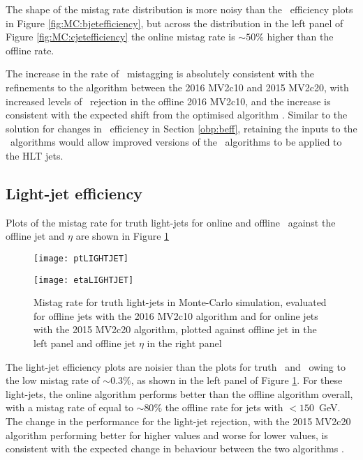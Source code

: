 		The shape of the mistag rate distribution is more noisy than the \bjet\ efficiency plots in Figure \ref{fig:MC:bjetefficiency}, but across the \pt distribution in the left panel of Figure \ref{fig:MC:cjetefficiency} the online mistag rate is $\sim50\%$ higher than the offline rate.

		The increase in the rate of \cjet\ mistagging is absolutely consistent with the refinements to the algorithm between the 2016 MV2c10 and 2015 MV2c20, with increased levels of \cjet\ rejection in the offline 2016 MV2c10, and the increase is consistent with the expected shift from the optimised algorithm \cite{btagOptimisation}. Similar to the solution for changes in \btag\ efficiency in Section \ref{obp:beff}, retaining the inputs to the \btag\ algorithms would allow improved versions of the \btag\ algorithms to be applied to the HLT jets.

	\subsection{Light-jet efficiency}

		Plots of the mistag rate for truth light-jets for online and offline \btag\ against the offline jet \pt and $\eta$ are shown in Figure \ref{fig:MC:lightjetefficiency}

		\begin{figure}[h]
			\centering
			\begin{minipage}[h]{0.48\linewidth}
				\texttt{[image: ptLIGHTJET]}

			\end{minipage}
			\quad
			\begin{minipage}[h]{0.48\linewidth}
				\texttt{[image: etaLIGHTJET]}
			\end{minipage}
			\caption[Comparison of mistag rate between online and offline truth light-jets in Monte-Carlo simulation]{Mistag rate for truth light-jets in Monte-Carlo simulation, evaluated for offline jets with the 2016 MV2c10 algorithm and for online jets with the 2015 MV2c20 algorithm, plotted against offline jet \pt in the left panel and offline jet $\eta$ in the right panel}
			\label{fig:MC:lightjetefficiency}
		\end{figure}

		The light-jet efficiency plots are noisier than the plots for truth \bjets\ and \cjets\ owing to the low mistag rate of $\sim0.3\%$, as shown in the left panel of Figure \ref{fig:MC:lightjetefficiency}. For these light-jets, the online algorithm performs better than the offline algorithm overall, with a mistag rate of equal to $\sim80\%$ the offline rate for jets with \pt$<150$~GeV. The change in the performance for the light-jet rejection, with the 2015 MV2c20 algorithm performing better for higher \pt values and worse for lower \pt values, is consistent with the expected change in behaviour between the two algorithms \cite{btagOptimisation}.


